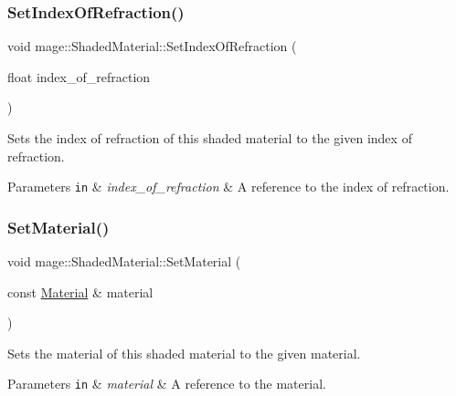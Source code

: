 \subsubsection{\texorpdfstring{Set\+Index\+Of\+Refraction()}{SetIndexOfRefraction()}}
{\footnotesize\ttfamily void mage\+::\+Shaded\+Material\+::\+Set\+Index\+Of\+Refraction (\begin{DoxyParamCaption}\item[{float}]{index\+\_\+of\+\_\+refraction }\end{DoxyParamCaption})\hspace{0.3cm}{\ttfamily [noexcept]}}

Sets the index of refraction of this shaded material to the given index of refraction.


\begin{DoxyParams}[1]{Parameters}
\mbox{\tt in}  & {\em index\+\_\+of\+\_\+refraction} & A reference to the index of refraction. \\
\hline
\end{DoxyParams}
\hypertarget{structmage_1_1_shaded_material_aca5966123c3267d431539bea500d244b}{}\label{structmage_1_1_shaded_material_aca5966123c3267d431539bea500d244b} 
\subsubsection{\texorpdfstring{Set\+Material()}{SetMaterial()}\hspace{0.1cm}{\footnotesize\ttfamily [1/2]}}
{\footnotesize\ttfamily void mage\+::\+Shaded\+Material\+::\+Set\+Material (\begin{DoxyParamCaption}\item[{const \hyperlink{structmage_1_1_material}{Material} \&}]{material }\end{DoxyParamCaption})}

Sets the material of this shaded material to the given material.


\begin{DoxyParams}[1]{Parameters}
\mbox{\tt in}  & {\em material} & A reference to the material. \\
\hline
\end{DoxyParams}
\hypertarget{structmage_1_1_shaded_material_a340a8eb8690a6ba809c33432607d02dd}{}\label{structmage_1_1_shaded_material_a340a8eb8690a6ba809c33432607d02dd} 
